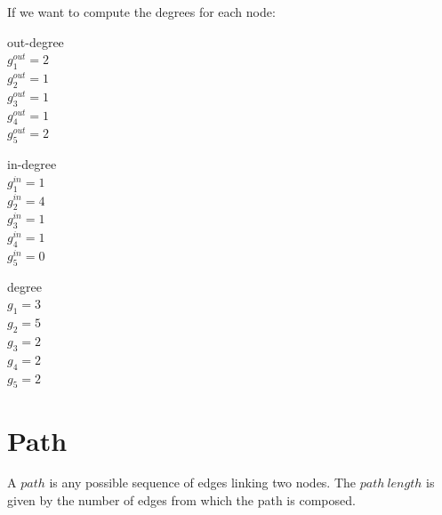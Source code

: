 \documentclass[12pt]{article}
\begin{document}
\noindent
If we want to compute the degrees for each node:

\vspace{20px}

\begin{minipage}[t]{0.3\textwidth}
	\begin{center}
			out-degree \\
			\vspace{20px}
			$g_1^{out} = 2$ \\
			$g_2^{out} = 1$ \\
			$g_3^{out} = 1$ \\
			$g_4^{out} = 1$ \\
			$g_5^{out} = 2$
	\end{center}
\end{minipage}\hfill
\begin{minipage}[t]{0.3\textwidth}
	\begin{center}
		in-degree \\
		\vspace{20px}
		$g_1^{in} = 1$ \\
		$g_2^{in} = 4$ \\
		$g_3^{in} = 1$ \\
		$g_4^{in} = 1$ \\
		$g_5^{in} = 0$
	\end{center}    
\end{minipage}\hfill
\begin{minipage}[t]{0.3\textwidth}
	\begin{center}
		degree \\
		\vspace{20px}        
		$g_1 = 3$ \\
		$g_2 = 5$ \\
		$g_3 = 2$ \\
		$g_4 = 2$ \\
		$g_5 = 2$
	\end{center}
\end{minipage}

\newpage

\section{Path}

A $path$ is any possible sequence of edges linking two nodes. The $path\ length$ is given by the number of edges from which the path is composed.

\vspace{20px}
\end{document}
